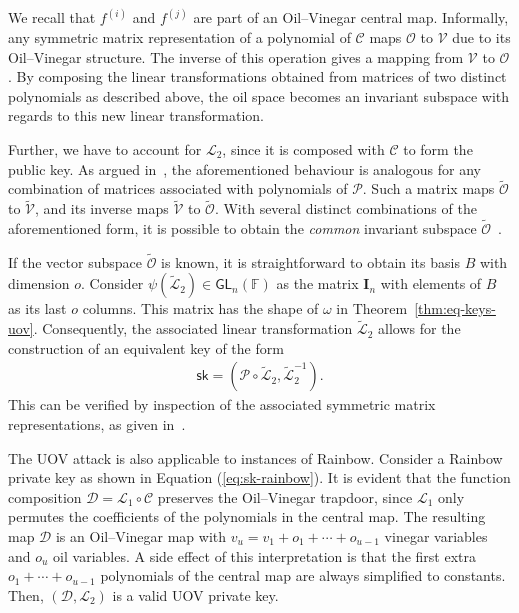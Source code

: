 \documentclass[12pt, a4paper, oneside]{memoir}
\theoremstyle{definition}
\begin{document}
We recall that $f^{(i)}$ and $f^{(j)}$ are part of an Oil--Vinegar central map. Informally, any symmetric matrix representation of a polynomial of $\mathcal{C}$ maps $\mathcal{O}$ to $\mathcal{V}$ due to its Oil--Vinegar structure. The inverse of this operation gives a mapping from $\mathcal{V}$ to $\mathcal{O}$. By composing the linear transformations obtained from matrices of two distinct polynomials as described above, the oil space becomes an invariant subspace with regards to this new linear transformation.

Further, we have to account for $\mathcal{L}_{2}$, since it is composed with $\mathcal{C}$ to form the public key. As argued in~\cite[p.~261]{Kipnis:199808}, the aforementioned behaviour is analogous for any combination of matrices associated with polynomials of $\mathcal{P}$. Such a matrix maps $\widetilde{\mathcal{O}}$ to $\widetilde{\mathcal{V}}$, and its inverse maps $\widetilde{\mathcal{V}}$ to $\widetilde{\mathcal{O}}$. With several distinct combinations of the aforementioned form, it is possible to obtain the \emph{common} invariant subspace $\widetilde{\mathcal{O}}$~\cite[Thm.~1]{Kipnis:199904}.

If the vector subspace $\widetilde{\mathcal{O}}$ is known, it is straightforward to obtain its basis $B$ with dimension $o$. Consider $\psi(\widetilde{\mathcal{L}}_{2}) \in \textsf{GL}_{n}(\mathbb{F})$ as the matrix $\mathbf{I}_{n}$ with elements of $B$ as its last $o$ columns. This matrix has the shape of $\omega$ in Theorem~\ref{thm:eq-keys-uov}. Consequently, the associated linear transformation $\widetilde{\mathcal{L}}_{2}$ allows for the construction of an equivalent key of the form
\begin{align}\label{eq:uov-attack-eq}
  \textsf{sk} = (\mathcal{P} \circ \widetilde{\mathcal{L}}_{2}, \widetilde{\mathcal{L}}_{2}^{-1}).
\end{align}
This can be verified by inspection of the associated symmetric matrix representations, as given in~\cite[p.~71]{Ding:2006}.

The UOV attack is also applicable to instances of Rainbow. Consider a Rainbow private key as shown in Equation (\ref{eq:sk-rainbow}). It is evident that the function composition $\mathcal{D} = \mathcal{L}_{1} \circ \mathcal{C}$ preserves the Oil--Vinegar trapdoor, since $\mathcal{L}_{1}$ only permutes the coefficients of the polynomials in the central map. The resulting map $\mathcal{D}$ is an Oil--Vinegar map with $v_{u} = v_{1} + o_{1} + \cdots + o_{u - 1}$ vinegar variables and $o_{u}$ oil variables. A side effect of this interpretation is that the first extra $o_{1} + \cdots + o_{u - 1}$ polynomials of the central map are always simplified to constants. Then, $(\mathcal{D}, \mathcal{L}_{2})$ is a valid UOV private key.
\end{document}
